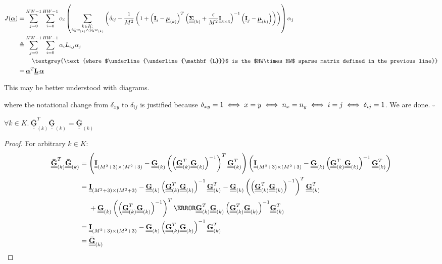 \documentclass{article}
\def\vt#1{\underline{\mathbf{#1}}}
\def\vts#1{\underline{\boldsymbol{#1}}}
\def\mt#1{\underline{\underline{\mathbf{#1}}}}
\def\mts#1{\underline{\underline{\boldsymbol{#1}}}}
\begin{document}
\begin{align*}
    J(\vts\alpha) &= \sum_{j=0}^{HW-1} \sum_{i=0}^{HW-1} \alpha_i \left(\sum_{\substack{k\in K:\\i\in w_{(k)}\wedge j\in w_{(k)}}} \left( \delta_{ij} - \frac1{M^2}\left(1 + \left(\vt{I}_{i} - \vts \mu_{(k)}\right)^T \left(\mts \Sigma_{(k)} + \frac\epsilon{M^2} \mt{I}_{3\times 3}\right)^{-1} \left(\vt{I}_{j} - \vts \mu_{(k)}\right) \right) \right)\right) \alpha_j\\
    &\triangleq \sum_{j=0}^{HW-1} \sum_{i=0}^{HW-1} \alpha_i L_{i,j} \alpha_j\\
    &\quad\quad\ \textgrey{\text{where $\mt L$ is the $HW\times HW$ sparse matrix defined in the previous line}}\\
    &= \vts \alpha^T \mt L\, \vts \alpha
\end{align*}

This may be better understood with diagrams.


where the notational change from $\delta_{xy}$ to $\delta_{ij}$ is justified because $\delta_{xy} = 1 \iff x=y \iff n_x = n_y \iff i = j\\ \iff \delta_{ij}=1$. We are done. \hfill$\square$


\begin{lemma}\label{lemma1}
    $\forall k \in K.\ \mt{\bar{G}}_{(k)}^T \mt{\bar{G}}_{(k)} = \mt{\bar{G}}_{(k)}$
    \begin{proof}
        For arbitrary $k\in K$:
        \begin{align*}
            \mt{\bar{G}}_{(k)}^T \mt{\bar{G}}_{(k)} &= \left(\mt I_{(M^2+3)\times(M^2+3)} -  \mt G_{(k)} \left(\left(\mt G_{(k)}^T \mt G_{(k)} \right)^{-1}\right)^T \mt G_{(k)}^T \right) \left(\mt I_{(M^2+3)\times(M^2+3)} -  \mt G_{(k)}\left(\mt G_{(k)}^T \mt G_{(k)} \right)^{-1} \mt G_{(k)}^T \right)\\
            &= \mt I_{(M^2+3)\times(M^2+3)} - \mt G_{(k)}\left(\mt G_{(k)}^T \mt G_{(k)} \right)^{-1} \mt G_{(k)}^T - \mt G_{(k)} \left(\left(\mt G_{(k)}^T \mt G_{(k)} \right)^{-1}\right)^T \mt G_{(k)}^T \\
            &\quad\ + \mt G_{(k)} \left(\left(\mt G_{(k)}^T \mt G_{(k)} \right)^{-1}\right)^T \cancel{\mt G_{(k)}^T \mt G_{(k)}\left(\mt G_{(k)}^T \mt G_{(k)} \right)^{-1}} \mt G_{(k)}^T \\
            &= \mt I_{(M^2+3)\times(M^2+3)} - \mt G_{(k)}\left(\mt G_{(k)}^T \mt G_{(k)} \right)^{-1} \mt G_{(k)}^T \\
            &= \mt{\bar{G}}_{(k)}
        \end{align*}
    \end{proof}
\end{lemma}
\end{document}
